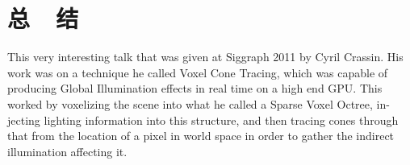 \section{总~~结}
This very interesting talk that was given at Siggraph 2011 by Cyril Crassin. His work was on a technique he called Voxel Cone Tracing, which was capable of producing Global Illumination effects in real time on a high end GPU. This worked by voxelizing the scene into what he called a Sparse Voxel Octree, in- jecting lighting information into this structure, and then tracing cones through that from the location of a pixel in world space in order to gather the indirect illumination affecting it.






























































